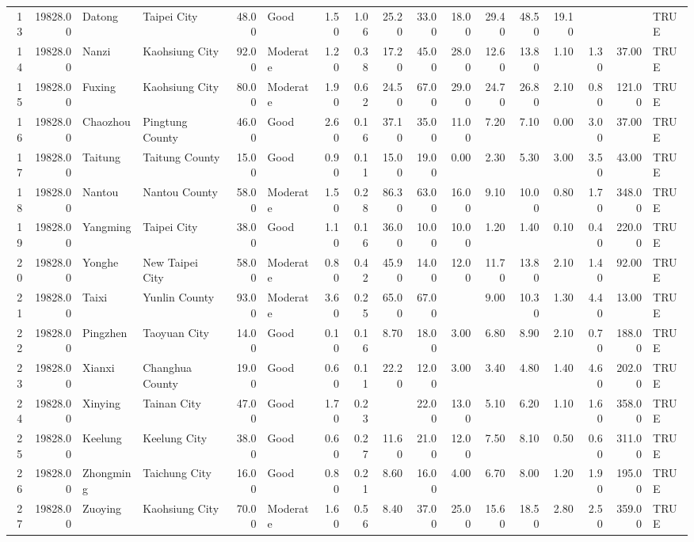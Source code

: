 \begin{table}[ht]
\begin{tabular}{rrllrlrrrrrrrrrrl}
  13 & 19828.00 & Datong & Taipei City & 48.00 & Good & 1.50 & 1.06 & 25.20 & 33.00 & 18.00 & 29.40 & 48.50 & 19.10 &  &  & TRUE \\ 
  14 & 19828.00 & Nanzi & Kaohsiung City & 92.00 & Moderate & 1.20 & 0.38 & 17.20 & 45.00 & 28.00 & 12.60 & 13.80 & 1.10 & 1.30 & 37.00 & TRUE \\ 
  15 & 19828.00 & Fuxing & Kaohsiung City & 80.00 & Moderate & 1.90 & 0.62 & 24.50 & 67.00 & 29.00 & 24.70 & 26.80 & 2.10 & 0.80 & 121.00 & TRUE \\ 
  16 & 19828.00 & Chaozhou & Pingtung County & 46.00 & Good & 2.60 & 0.16 & 37.10 & 35.00 & 11.00 & 7.20 & 7.10 & 0.00 & 3.00 & 37.00 & TRUE \\ 
  17 & 19828.00 & Taitung & Taitung County & 15.00 & Good & 0.90 & 0.11 & 15.00 & 19.00 & 0.00 & 2.30 & 5.30 & 3.00 & 3.50 & 43.00 & TRUE \\ 
  18 & 19828.00 & Nantou & Nantou County & 58.00 & Moderate & 1.50 & 0.28 & 86.30 & 63.00 & 16.00 & 9.10 & 10.00 & 0.80 & 1.70 & 348.00 & TRUE \\ 
  19 & 19828.00 & Yangming & Taipei City & 38.00 & Good & 1.10 & 0.16 & 36.00 & 10.00 & 10.00 & 1.20 & 1.40 & 0.10 & 0.40 & 220.00 & TRUE \\ 
  20 & 19828.00 & Yonghe & New Taipei City & 58.00 & Moderate & 0.80 & 0.42 & 45.90 & 14.00 & 12.00 & 11.70 & 13.80 & 2.10 & 1.40 & 92.00 & TRUE \\ 
  21 & 19828.00 & Taixi & Yunlin County & 93.00 & Moderate & 3.60 & 0.25 & 65.00 & 67.00 &  & 9.00 & 10.30 & 1.30 & 4.40 & 13.00 & TRUE \\ 
  22 & 19828.00 & Pingzhen & Taoyuan City & 14.00 & Good & 0.10 & 0.16 & 8.70 & 18.00 & 3.00 & 6.80 & 8.90 & 2.10 & 0.70 & 188.00 & TRUE \\ 
  23 & 19828.00 & Xianxi & Changhua County & 19.00 & Good & 0.60 & 0.11 & 22.20 & 12.00 & 3.00 & 3.40 & 4.80 & 1.40 & 4.60 & 202.00 & TRUE \\ 
  24 & 19828.00 & Xinying & Tainan City & 47.00 & Good & 1.70 & 0.23 &  & 22.00 & 13.00 & 5.10 & 6.20 & 1.10 & 1.60 & 358.00 & TRUE \\ 
  25 & 19828.00 & Keelung & Keelung City & 38.00 & Good & 0.60 & 0.27 & 11.60 & 21.00 & 12.00 & 7.50 & 8.10 & 0.50 & 0.60 & 311.00 & TRUE \\ 
  26 & 19828.00 & Zhongming & Taichung City & 16.00 & Good & 0.80 & 0.21 & 8.60 & 16.00 & 4.00 & 6.70 & 8.00 & 1.20 & 1.90 & 195.00 & TRUE \\ 
  27 & 19828.00 & Zuoying & Kaohsiung City & 70.00 & Moderate & 1.60 & 0.56 & 8.40 & 37.00 & 25.00 & 15.60 & 18.50 & 2.80 & 2.50 & 359.00 & TRUE \\ 

\end{tabular}
\end{table}
